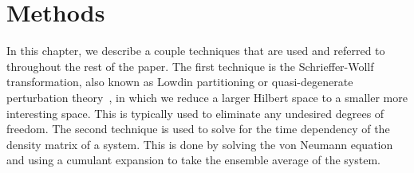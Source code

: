\chapter{Methods}\label{CH:methods}

In this chapter, we describe a couple techniques that are used and referred to throughout the rest of the paper.
The first technique is the Schrieffer-Wollf transformation, also known as Lowdin partitioning or quasi-degenerate perturbation theory~\cite{winkler_2003}, in which we reduce a larger Hilbert space to a smaller more interesting space.
This is typically used to eliminate any undesired degrees of freedom.
The second technique is used to solve for the time dependency of the density matrix of a system.
This is done by solving the von Neumann equation and using a cumulant expansion to take the ensemble average of the system.







